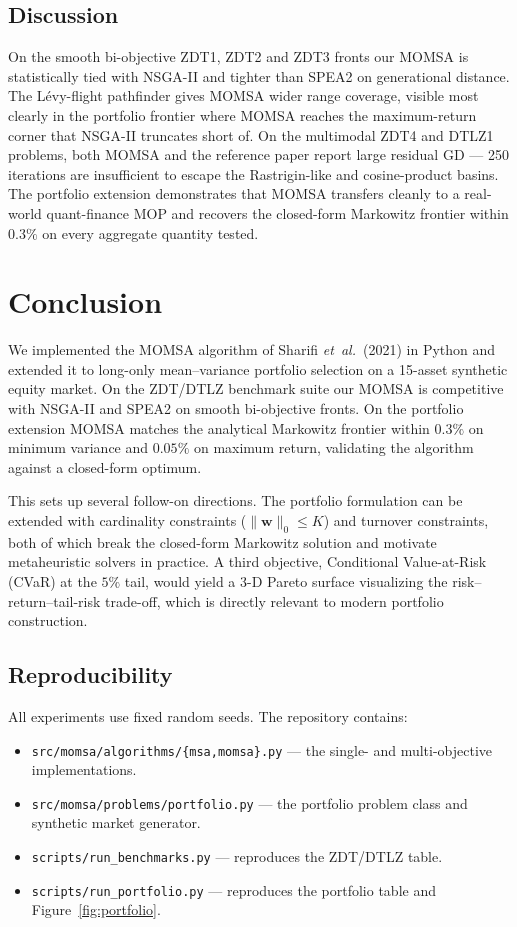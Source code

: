 \documentclass[11pt,a4paper]{article}
\begin{document}
\FloatBarrier

\subsection{Discussion}

On the smooth bi-objective ZDT1, ZDT2 and ZDT3 fronts our MOMSA is
statistically tied with NSGA-II and tighter than SPEA2 on
generational distance. The L\'evy-flight pathfinder gives MOMSA wider
range coverage, visible most clearly in the portfolio frontier where
MOMSA reaches the maximum-return corner that NSGA-II truncates short
of. On the multimodal ZDT4 and DTLZ1 problems, both MOMSA and the
reference paper report large residual GD --- 250 iterations are
insufficient to escape the Rastrigin-like and cosine-product basins.
The portfolio extension demonstrates that MOMSA transfers cleanly to a
real-world quant-finance MOP and recovers the closed-form Markowitz
frontier within $0.3\%$ on every aggregate quantity tested.

\section{Conclusion}
\label{sec:conclusion}

We implemented the MOMSA algorithm of Sharifi \textit{et~al.}\ (2021)
in Python and extended it to long-only mean--variance portfolio
selection on a 15-asset synthetic equity market. On the ZDT/DTLZ
benchmark suite our MOMSA is competitive with NSGA-II and SPEA2 on
smooth bi-objective fronts. On the portfolio extension MOMSA matches
the analytical Markowitz frontier within $0.3\%$ on minimum variance
and $0.05\%$ on maximum return, validating the algorithm against a
closed-form optimum.

This sets up several follow-on directions. The portfolio formulation can
be extended with cardinality constraints
($\|\mathbf{w}\|_0 \leq K$) and turnover constraints, both of which
break the closed-form Markowitz solution and motivate metaheuristic
solvers in practice. A third objective, Conditional Value-at-Risk
(CVaR) at the $5\%$ tail, would yield a 3-D Pareto surface visualizing
the risk--return--tail-risk trade-off, which is directly relevant to
modern portfolio construction.

\subsection*{Reproducibility}

All experiments use fixed random seeds. The repository contains:
\begin{itemize}[leftmargin=2em]
\item \texttt{src/momsa/algorithms/\{msa,momsa\}.py} --- the
single- and multi-objective implementations.
\item \texttt{src/momsa/problems/portfolio.py} --- the portfolio
problem class and synthetic market generator.
\item \texttt{scripts/run\_benchmarks.py} --- reproduces the
ZDT/DTLZ table.
\item \texttt{scripts/run\_portfolio.py} --- reproduces the
portfolio table and Figure~\ref{fig:portfolio}.
\end{itemize}
\end{document}
